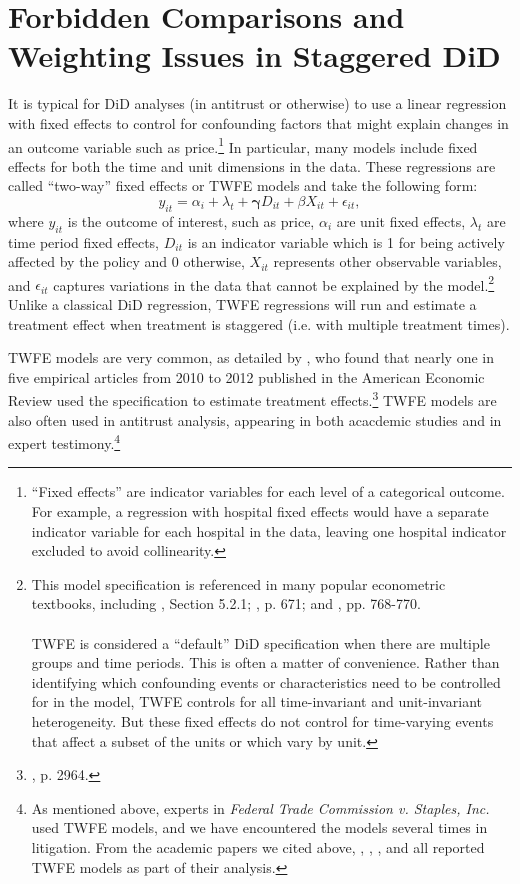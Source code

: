 \documentclass[12pt]{article}
\begin{document}
\section{Forbidden Comparisons and Weighting Issues in Staggered DiD} \label{sec:literature}
It is typical for DiD analyses (in antitrust or otherwise) to use a linear regression with fixed effects to control for confounding factors that might explain changes in an outcome variable such as price.\footnote{``Fixed effects'' are indicator variables for each level of a categorical outcome. For example, a regression with hospital fixed effects would have a separate indicator variable for each hospital in the data, leaving one hospital indicator excluded to avoid collinearity.} In particular, many models include fixed effects for both the time and unit dimensions in the data. These regressions are called ``two-way'' fixed effects or TWFE models and take the following form:
\begin{equation}
    y_{it} = \alpha_i + \lambda_t + \boldsymbol{\gamma}  D_{it} + \beta X_{it} + \epsilon_{it},
\end{equation}
where $y_{it}$ is the outcome of interest, such as price, $\alpha_i$ are unit fixed effects, $\lambda_t$ are time period fixed effects, $D_{it}$ is an indicator variable which is 1 for being actively affected by the policy and 0 otherwise, $X_{it}$ represents other observable variables, and  $\epsilon_{it}$ captures variations in the data that cannot be explained by the model.\footnote{This model specification is referenced in many popular econometric textbooks, including  \citet{angrist2009mostly}, Section 5.2.1; \citet{hansen2022econometrics}, p. 671; and \citet{cameron2020}, pp. 768-770. \\\\ TWFE is considered a “default” DiD specification when there are multiple groups and time periods. This is often a matter of convenience. Rather than identifying which confounding events or characteristics need to be controlled for in the model, TWFE controls for all time-invariant and unit-invariant heterogeneity. But these fixed effects do not control for time-varying events that affect a subset of the units or which vary by unit.} Unlike a classical DiD regression, TWFE regressions will run and estimate a treatment effect when treatment is staggered (i.e. with multiple treatment times).

TWFE models are very common, as detailed by \citet{de2020two}, who found that nearly one in five empirical articles from 2010 to 2012 published in the American Economic Review used the specification to estimate treatment effects.\footnote{\citet{de2020two}, p. 2964.} TWFE models are also often used in antitrust analysis, appearing in both acacdemic studies and in expert testimony.\footnote{As mentioned above, experts in \textit{Federal Trade Commission v. Staples, Inc.} used TWFE models, and we have encountered the models several times in litigation. From the academic papers we cited above, \citet{hosken2022vertical}, \citet{prager2021employer}, \citet{carlton2019legacy}, and \citet{goolsbee2008incumbents} all reported TWFE models as part of their analysis.}
\end{document}

